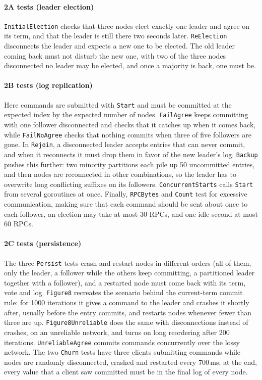 \documentclass[conference]{IEEEtran}
\begin{document}
\paragraph{2A tests (leader election)} \texttt{InitialElection} checks that three nodes elect exactly one leader and agree on its term, and that the leader is still there two seconds later. \texttt{ReElection} disconnects the leader and expects a new one to be elected. The old leader coming back must not disturb the new one, with two of the three nodes disconnected no leader may be elected, and once a majority is back, one must be.

\paragraph{2B tests (log replication)} Here commands are submitted with \texttt{Start} and must be committed at the expected index by the expected number of nodes. \texttt{FailAgree} keeps committing with one follower disconnected and checks that it catches up when it comes back, while \texttt{FailNoAgree} checks that nothing commits when three of five followers are gone. In \texttt{Rejoin}, a disconnected leader accepts entries that can never commit, and when it reconnects it must drop them in favor of the new leader's log. \texttt{Backup} pushes this further: two minority partitions each pile up 50 uncommitted entries, and then nodes are reconnected in other combinations, so the leader has to overwrite long conflicting suffixes on its followers. \texttt{ConcurrentStarts} calls \texttt{Start} from several goroutines at once. Finally, \texttt{RPCBytes} and \texttt{Count} test for excessive communication, making sure that each command should be sent about once to each follower, an election may take at most 30 RPCs, and one idle second at most 60 RPCs.

\paragraph{2C tests (persistence)} The three \texttt{Persist} tests crash and restart nodes in different orders (all of them, only the leader, a follower while the others keep committing, a partitioned leader together with a follower), and a restarted node must come back with its term, vote and log. \texttt{Figure8} recreates the scenario behind the current-term commit rule: for 1000 iterations it gives a command to the leader and crashes it shortly after, usually before the entry commits, and restarts nodes whenever fewer than three are up. \texttt{Figure8Unreliable} does the same with disconnections instead of crashes, on an unreliable network, and turns on long reordering after 200 iterations. \texttt{UnreliableAgree} commits commands concurrently over the lossy network. The two \texttt{Churn} tests have three clients submitting commands while nodes are randomly disconnected, crashed and restarted every 700\,ms; at the end, every value that a client saw committed must be in the final log of every node.
\end{document}
